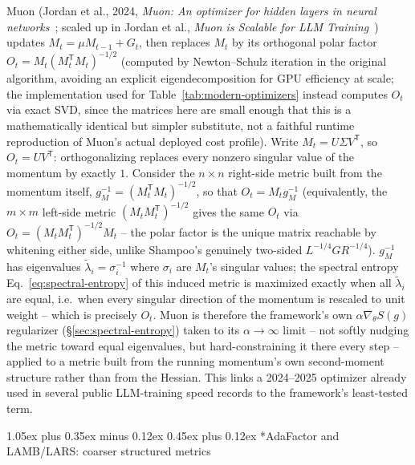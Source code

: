 \documentclass[10pt,twocolumn]{article}
\makeatletter
\renewcommand\subsection{\@startsection{subsection}{2}{0pt}%
  {1.05ex plus 0.35ex minus 0.12ex}%
  {0.45ex plus 0.12ex}%
  {\normalsize\bfseries}}
\makeatother
\begin{document}
Muon (Jordan et al., 2024, \emph{Muon: An optimizer for hidden layers in
neural networks}~\cite{jordan2024muon}; scaled up in Jordan et al., \emph{Muon
is Scalable for LLM Training}~\cite{jordan2025muonscalable}) updates $M_t=\mu M_{t-1}+G_t$, then replaces
$M_t$ by its orthogonal polar factor $O_t=M_t(M_t^{\mathsf T}M_t)^{-1/2}$
(computed by Newton--Schulz iteration in the original algorithm, avoiding an
explicit eigendecomposition for GPU efficiency at scale; the implementation
used for Table~\ref{tab:modern-optimizers} instead computes $O_t$ via exact
SVD, since the matrices here are small enough that this is a mathematically
identical but simpler substitute, not a faithful runtime reproduction of
Muon's actual deployed cost profile). Write $M_t=U\Sigma
V^{\mathsf T}$, so $O_t=UV^{\mathsf T}$: orthogonalizing replaces every
nonzero singular value of the momentum by exactly $1$. Consider the
$n\times n$ right-side metric built from the momentum itself,
$g_M^{-1}=(M_t^{\mathsf T}M_t)^{-1/2}$, so that $O_t=M_tg_M^{-1}$
(equivalently, the $m\times m$ left-side metric $(M_tM_t^{\mathsf
T})^{-1/2}$ gives the same $O_t$ via $O_t=(M_tM_t^{\mathsf T})^{-1/2}M_t$ --
the polar factor is the unique matrix reachable by whitening either side,
unlike Shampoo's genuinely two-sided $L^{-1/4}GR^{-1/4}$). $g_M^{-1}$ has
eigenvalues $\tilde\lambda_i=\sigma_i^{-1}$ where $\sigma_i$ are $M_t$'s
singular values; the spectral entropy Eq.~\eqref{eq:spectral-entropy} of
this induced metric is maximized exactly when all $\tilde\lambda_i$ are
equal, i.e.\ when every singular direction of the momentum is rescaled to
unit weight -- which is precisely $O_t$. Muon is therefore the framework's own
$\alpha\nabla_\theta S(g)$ regularizer (\S\ref{sec:spectral-entropy}) taken to
its $\alpha\to\infty$ limit -- not softly nudging the metric toward equal
eigenvalues, but hard-constraining it there every step -- applied to a metric
built from the running momentum's own second-moment structure rather than
from the Hessian. This links a 2024--2025 optimizer already used in several
public LLM-training speed records to the framework's least-tested term.

\subsection*{AdaFactor and LAMB/LARS: coarser structured metrics}
\end{document}
